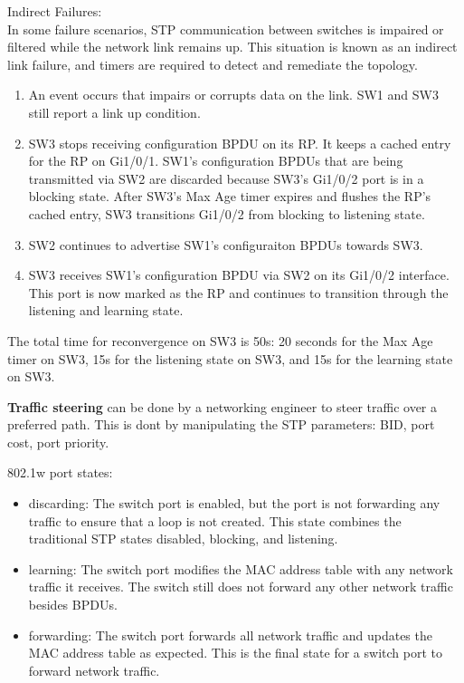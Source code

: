 \documentclass{article}
\begin{document}
	Indirect Failures:\\
		In some failure scenarios, STP communication between switches is impaired or filtered while the network link remains up. This situation is known as an indirect link failure, and timers are required to detect and remediate the topology.
		\begin{enumerate}
			\item An event occurs that impairs or corrupts data on the link. SW1 and SW3 still report a link up condition.
			\item SW3 stops receiving configuration BPDU on its RP. It keeps a cached entry for the RP on Gi1/0/1. SW1's configuration BPDUs that are being transmitted via SW2 are discarded because SW3's Gi1/0/2 port is in a blocking state.
			After SW3's Max Age timer expires and flushes the RP's cached entry, SW3 transitions Gi1/0/2 from blocking to listening state.	
			\item SW2 continues to advertise SW1's configuraiton BPDUs towards SW3.
			\item SW3 receives SW1's configuration BPDU via SW2 on its Gi1/0/2 interface. This port is now marked as the RP and continues to transition through the listening and learning state.
		\end{enumerate}

	The total time for reconvergence on SW3 is 50s: 20 seconds for the Max Age timer on SW3, 15s for the listening state on SW3, and 15s for the learning state on SW3.

\textbf{Traffic steering} can be done by a networking engineer to steer traffic over a preferred path. This is dont by manipulating the STP parameters: BID, port cost, port priority.

802.1w port states:
	\begin{itemize}
		\item discarding: The switch port is enabled, but the port is not forwarding any traffic to ensure that a loop is not created. This state combines the traditional STP states disabled, blocking, and listening.
		\item learning: The switch port modifies the MAC address table with any network traffic it receives. The switch still does not forward any other network traffic besides BPDUs.
		\item forwarding: The switch port forwards all network traffic and updates the MAC address table as expected. This is the final state for a switch port to forward network traffic.
	\end{itemize}
\end{document}
